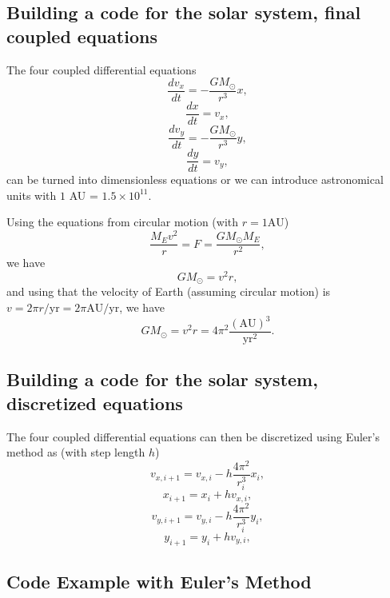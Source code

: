 \documentclass[%
oneside,                 %
final,                   %
10pt]{article}
\begin{document}
\subsection*{Building a code for the solar system, final coupled equations}

The four coupled differential equations
\[
\frac{dv_x}{dt}=-\frac{GM_{\odot}}{r^3}x,
\]
\[
\frac{dx}{dt}=v_x,
\]
\[
\frac{dv_y}{dt}=-\frac{GM_{\odot}}{r^3}y,
\]
\[
\frac{dy}{dt}=v_y,
\]
can be turned into dimensionless equations or we can introduce astronomical units with $1$ AU = $1.5\times 10^{11}$. 

Using the equations from circular motion (with $r =1\mathrm{AU}$) 
\[
\frac{M_E v^2}{r} = F = \frac{GM_{\odot}M_E}{r^2},
\]
we have
\[
GM_{\odot}=v^2r,
\]
and using that the velocity of Earth (assuming circular motion) is
$v = 2\pi r/\mathrm{yr}=2\pi\mathrm{AU}/\mathrm{yr}$, we have
\[
GM_{\odot}= v^2r = 4\pi^2 \frac{(\mathrm{AU})^3}{\mathrm{yr}^2}.
\]

\subsection*{Building a code for the solar system, discretized equations}

The four coupled differential equations can then be discretized using Euler's method as (with step length $h$)
\[
v_{x,i+1}=v_{x,i}-h\frac{4\pi^2}{r_i^3}x_i,
\]
\[
x_{i+1}=x_i+hv_{x,i},
\]
\[
v_{y,i+1}=v_{y,i}-h\frac{4\pi^2}{r_i^3}y_i,
\]
\[
y_{i+1}=y_i+hv_{y,i},
\]

\subsection*{Code Example with Euler's Method}
\end{document}
